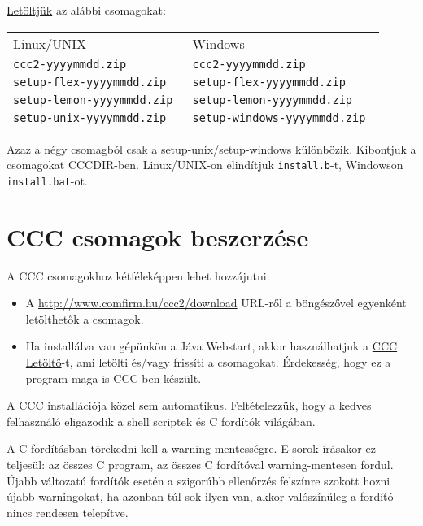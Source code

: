 \href{http://www.comfirm.hu/ccc2/download}{Letöltjük} az alábbi csomagokat:
\begin{center}
\begin{tabular}{|l|l|}
     Linux/UNIX                     & Windows\\
     \tt ccc2-yyyymmdd.zip          & \tt ccc2-yyyymmdd.zip \\
     \tt setup-flex-yyyymmdd.zip    & \tt setup-flex-yyyymmdd.zip \\
     \tt setup-lemon-yyyymmdd.zip   & \tt setup-lemon-yyyymmdd.zip \\
     \tt setup-unix-yyyymmdd.zip    & \tt setup-windows-yyyymmdd.zip \\
\end{tabular}
\end{center}

Azaz a négy csomagból csak a setup-unix/setup-windows különbözik.
Kibontjuk a csomagokat CCCDIR-ben.
Linux/UNIX-on elindítjuk \verb!install.b!-t, Windowson
\verb!install.bat!-ot.



\section{CCC csomagok beszerzése}
 
A CCC csomagokhoz kétféleképpen lehet hozzájutni:
\begin{itemize}
\item 
  A \href{http://www.comfirm.hu/ccc2/download}{http://www.comfirm.hu/ccc2/download}
  URL-ről a böngészővel egyenként letölthetők a csomagok.
\item 
  Ha installálva van gépünkön a Jáva Webstart, akkor használhatjuk a
  \href{http://www.comfirm.hu/jnlp/cccdown.jnlp}{CCC Letöltő}-t,
  ami letölti és/vagy frissíti a csomagokat.
  Érdekesség, hogy ez a program maga is CCC-ben készült.
\end{itemize}


A CCC installációja közel sem automatikus. 
Feltételezzük, hogy a kedves felhasználó eligazodik
a shell scriptek és C fordítók világában. 

A C fordításban törekedni kell a warning-mentességre.
E sorok írásakor ez teljesül: az összes C program, az összes
C fordítóval warning-mentesen fordul. Újabb változatú
fordítók esetén a szigorúbb ellenőrzés felszínre szokott hozni
újabb warningokat, ha azonban túl sok ilyen van, akkor
valószínűleg a fordító nincs rendesen telepítve.

